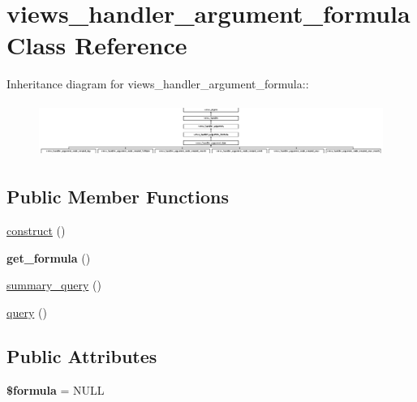 \hypertarget{classviews__handler__argument__formula}{
\section{views\_\-handler\_\-argument\_\-formula Class Reference}
\label{classviews__handler__argument__formula}
}
Inheritance diagram for views\_\-handler\_\-argument\_\-formula::\begin{figure}[H]
\begin{center}
\leavevmode
\includegraphics[height=1.75549cm]{classviews__handler__argument__formula}
\end{center}
\end{figure}
\subsection*{Public Member Functions}
\begin{CompactItemize}
\item 
\hyperlink{classviews__handler__argument__formula_01284402427de2bcfa1b1da5792a2332}{construct} ()
\item 
\hypertarget{classviews__handler__argument__formula_e1020f5dfbc10c763872797d6fdc2248}{
\textbf{get\_\-formula} ()}
\label{classviews__handler__argument__formula_e1020f5dfbc10c763872797d6fdc2248}

\item 
\hyperlink{classviews__handler__argument__formula_377fd11d178f88a0bd68c2ec9d6f9e00}{summary\_\-query} ()
\item 
\hyperlink{classviews__handler__argument__formula_a9cb66a17cfded1800dac4c10c20f2ee}{query} ()
\end{CompactItemize}
\subsection*{Public Attributes}
\begin{CompactItemize}
\item 
\hypertarget{classviews__handler__argument__formula_536a444a8d134684f446a14895b46730}{
\textbf{\$formula} = NULL}
\label{classviews__handler__argument__formula_536a444a8d134684f446a14895b46730}

\end{CompactItemize}


